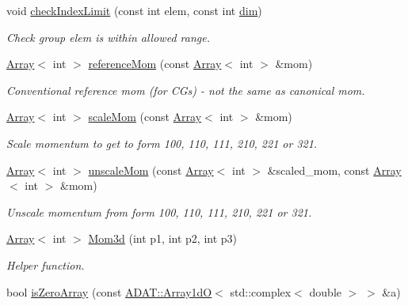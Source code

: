 \begin{DoxyCompactItemize}
void \mbox{\hyperlink{namespaceHadron_a32841ac341a167a00453d3846a386fd9}{check\+Index\+Limit}} (const int elem, const int \mbox{\hyperlink{irrep__util_8cc_a70b5e28b5bc3d1b63a7435c5fe50b837}{dim}})
\begin{DoxyCompactList}\small\item\em Check group elem is within allowed range. \end{DoxyCompactList}\item 
\mbox{\hyperlink{classXMLArray_1_1Array}{Array}}$<$ int $>$ \mbox{\hyperlink{namespaceHadron_a8a4e39ac150585731d18fb970ec8a1bd}{reference\+Mom}} (const \mbox{\hyperlink{classXMLArray_1_1Array}{Array}}$<$ int $>$ \&mom)
\begin{DoxyCompactList}\small\item\em Conventional reference mom (for C\+Gs) -\/ not the same as canonical mom. \end{DoxyCompactList}\item 
\mbox{\hyperlink{classXMLArray_1_1Array}{Array}}$<$ int $>$ \mbox{\hyperlink{namespaceHadron_ab3424b316e2a4d8e820c88f8027742e1}{scale\+Mom}} (const \mbox{\hyperlink{classXMLArray_1_1Array}{Array}}$<$ int $>$ \&mom)
\begin{DoxyCompactList}\small\item\em Scale momentum to get to form 100, 110, 111, 210, 221 or 321. \end{DoxyCompactList}\item 
\mbox{\hyperlink{classXMLArray_1_1Array}{Array}}$<$ int $>$ \mbox{\hyperlink{namespaceHadron_ad5e2b22f66d2effe70db7f0ba129eae1}{unscale\+Mom}} (const \mbox{\hyperlink{classXMLArray_1_1Array}{Array}}$<$ int $>$ \&scaled\+\_\+mom, const \mbox{\hyperlink{classXMLArray_1_1Array}{Array}}$<$ int $>$ \&mom)
\begin{DoxyCompactList}\small\item\em Unscale momentum from form 100, 110, 111, 210, 221 or 321. \end{DoxyCompactList}\item 
\mbox{\hyperlink{classXMLArray_1_1Array}{Array}}$<$ int $>$ \mbox{\hyperlink{namespaceHadron_af72905f43cac8c79d2479565a6fe54d3}{Mom3d}} (int p1, int p2, int p3)
\begin{DoxyCompactList}\small\item\em Helper function. \end{DoxyCompactList}\item 
bool \mbox{\hyperlink{namespaceHadron_a4c6b00854fd4dc574c56c8ddfd1a253f}{is\+Zero\+Array}} (const \mbox{\hyperlink{classADAT_1_1Array1dO}{A\+D\+A\+T\+::\+Array1dO}}$<$ std\+::complex$<$ double $>$ $>$ \&a)

\end{DoxyCompactItemize}
